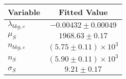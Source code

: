 \begin{tabular}[t]{lc}
\hline
Variable &Fitted Value\\
\hline\hline
$\lambda_{bkg,c}$&$-0.00432\pm0.00049$\\
\hline
$\mu_{S}$&$1968.63\pm0.17$\\
\hline
$n_{bkg,c}$&$(5.75\pm0.11)\times 10^3$\\
\hline
$n_{S}$&$(5.90\pm0.11)\times 10^3$\\
\hline
$\sigma_{S}$&$9.21\pm0.17$\\
\hline
\end{tabular}